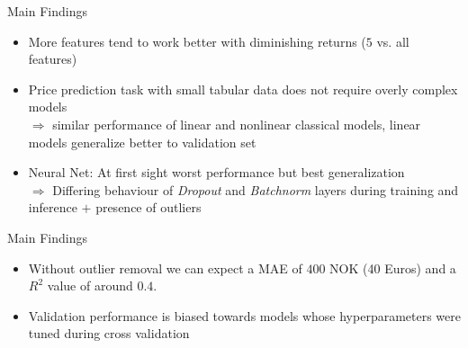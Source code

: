 \documentclass[ngerman,inputenc]{beamer}
\begin{document}
\begin{frame}{Main Findings}
  \begin{itemize}
    \item More features tend to work better with diminishing returns ($5$ vs. all features)
    \item Price prediction task with small tabular data does not require overly complex models \\
          $\Rightarrow$ similar performance of linear and nonlinear classical models,  linear models generalize better to validation set
    \item Neural Net: At first sight worst performance but best generalization \\
          $\Rightarrow$ Differing behaviour of \emph{Dropout} and \emph{Batchnorm} layers during training and inference $+$ presence of outliers
  \end{itemize}
\end{frame}

\begin{frame}{Main Findings}
  \begin{itemize}
    \item Without outlier removal we can expect a MAE of $400$ NOK (40 Euros) and a $R^2$ value of around $0.4$.
    \item Validation performance is biased towards models whose hyperparameters were tuned during cross validation
  \end{itemize}
\end{frame}
\end{document}
